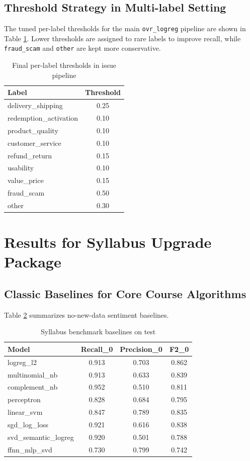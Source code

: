 \documentclass[12pt,a4paper]{article}
\begin{document}
\subsection{Threshold Strategy in Multi-label Setting}
The tuned per-label thresholds for the main \texttt{ovr\_logreg} pipeline are shown in Table \ref{tab:issue_thresholds}. Lower thresholds are assigned to rare labels to improve recall, while \texttt{fraud\_scam} and \texttt{other} are kept more conservative.

\begin{table}[H]
\centering
\caption{Final per-label thresholds in issue pipeline}
\label{tab:issue_thresholds}
\begin{tabular}{lc}
\toprule
Label & Threshold \\
\midrule
delivery\_shipping & 0.25 \\
redemption\_activation & 0.10 \\
product\_quality & 0.10 \\
customer\_service & 0.10 \\
refund\_return & 0.15 \\
usability & 0.10 \\
value\_price & 0.15 \\
fraud\_scam & 0.50 \\
other & 0.30 \\
\bottomrule
\end{tabular}
\end{table}

\section{Results for Syllabus Upgrade Package}
\subsection{Classic Baselines for Core Course Algorithms}
Table \ref{tab:syllabus_baselines} summarizes no-new-data sentiment baselines.

\begin{table}[H]
\centering
\caption{Syllabus benchmark baselines on test}
\label{tab:syllabus_baselines}
\begin{tabular}{lccc}
\toprule
Model & Recall\_0 & Precision\_0 & F2\_0 \\
\midrule
logreg\_l2 & 0.913 & 0.703 & 0.862 \\
multinomial\_nb & 0.913 & 0.633 & 0.839 \\
complement\_nb & 0.952 & 0.510 & 0.811 \\
perceptron & 0.828 & 0.684 & 0.795 \\
linear\_svm & 0.847 & 0.789 & 0.835 \\
sgd\_log\_loss & 0.921 & 0.616 & 0.838 \\
svd\_semantic\_logreg & 0.920 & 0.501 & 0.788 \\
ffnn\_mlp\_svd & 0.730 & 0.799 & 0.742 \\
\bottomrule
\end{tabular}
\end{table}
\end{document}
